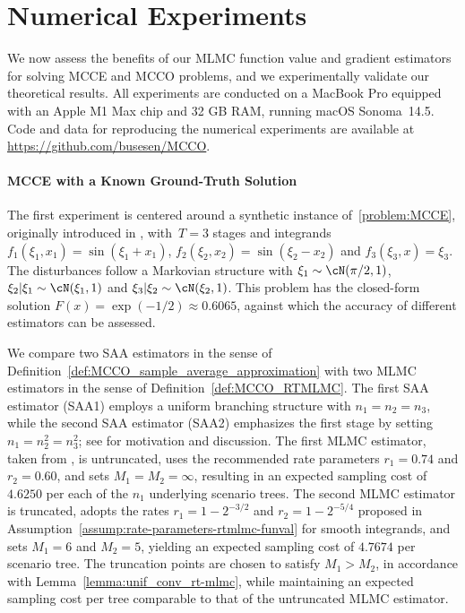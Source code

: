 \documentclass[11pt]{article}
\begin{document}
\section{Numerical Experiments} \label{sec:experiments}
We now assess the benefits of our MLMC function value and gradient estimators for solving MCCE and MCCO problems, and we experimentally validate our theoretical results. All experiments are conducted on a MacBook Pro equipped with an Apple M1 Max chip and 32 GB RAM, running macOS Sonoma~14.5. Code and data for reproducing the numerical experiments are available at \url{https://github.com/busesen/MCCO}. 





\paragraph{MCCE with a Known Ground-Truth Solution}
The first experiment is centered around a synthetic instance of~\eqref{problem:MCCE}, originally introduced in \citep[\S~3.1]{syed2023optimal}, with~$T=3$ stages and integrands $f_1(\xi_1,x_1)=\sin(\xi_1+x_1)$, $f_2(\xi_2,x_2)=\sin(\xi_2-x_2)$ and $f_3(\xi_3,x)=\xi_3$. The disturbances follow a Markovian structure with $\xi_1\sim \cN(\pi/2,1)$, $\xi_2|\xi_1\sim \cN(\xi_1,1)$ and $\xi_3|\xi_2\sim \cN(\xi_2,1)$. This problem has the closed-form solution $F(x)=\exp(-1/2)\approx 0.6065$, against which the accuracy of different estimators can be assessed.


We compare two SAA estimators in the sense of Definition~\ref{def:MCCO_sample_average_approximation} with two MLMC estimators in the sense of Definition~\ref{def:MCCO_RTMLMC}. The first SAA estimator (SAA1) employs a uniform branching structure with $n_1=n_2=n_3$, while the second SAA estimator (SAA2) emphasizes the first stage by setting $n_1=n_2^2=n_3^2$; see \cite{syed2023optimal,rainforth2018nesting} for motivation and discussion. The first MLMC estimator, taken from \cite{syed2023optimal}, is untruncated, uses the recommended rate parameters $r_1=0.74$ and $r_2=0.60$, and sets $M_1=M_2=\infty$, resulting in an expected sampling cost of $4.6250$ per each of the $n_1$ underlying scenario trees. The second MLMC estimator is truncated, adopts the rates $r_1=1-2^{-3/2}$ and $r_2=1-2^{-5/4}$ proposed in Assumption~\ref{assump:rate-parameters-rtmlmc-funval} for smooth integrands, and sets $M_1=6$ and $M_2=5$, yielding an expected sampling cost of $4.7674$ per scenario tree. The truncation points are chosen to satisfy $M_1> M_2$, in accordance with Lemma~\ref{lemma:unif_conv_rt-mlmc}, while maintaining an expected sampling cost per tree comparable to that of the untruncated MLMC estimator.
\end{document}

